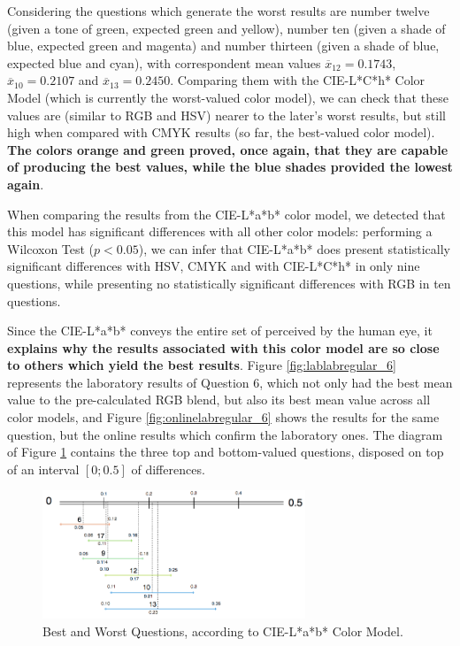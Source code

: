 %
Considering the questions which generate the worst results are number twelve (given a tone of green, expected green and yellow), number ten (given a shade of blue, expected green and magenta) and number thirteen
(given a shade of blue, expected blue and cyan), with correspondent mean values $\overline{x}_{12} = 0.1743$, $\overline{x}_{10} = 0.2107$ and $\overline{x}_{13} = 0.2450$. Comparing them with the CIE-L*C*h* Color Model
(which is currently the worst-valued color model), we can check that these values are (similar to RGB and HSV) nearer to the later's worst results, but still high when compared with CMYK results (so far, the
best-valued color model). \textbf{The colors orange and green proved, once again, that they are capable of producing the best values, while the blue shades provided the lowest again}. \par
%
When comparing the results from the CIE-L*a*b* color model, we detected that this model has significant differences with all other color models: performing a Wilcoxon Test ($p < 0.05$), we can infer that
CIE-L*a*b* does present statistically significant differences with HSV, CMYK and with CIE-L*C*h* in only nine questions, while presenting no statistically significant differences with RGB
in ten questions. \par
%
Since the CIE-L*a*b* conveys the entire set of perceived by the human eye, it \textbf{explains why the results associated with this color model are so close to others which yield the best results}.
Figure \ref{fig:lablabregular_6} represents the laboratory results of Question 6, which not only had the best mean value to the pre-calculated RGB blend, but also its best mean value across all color models,
and Figure \ref{fig:onlinelabregular_6} shows the results for the same question, but the online results which confirm the laboratory ones. The diagram of Figure \ref{fig:lab_analysis} contains the three top and bottom-valued questions, disposed on top of an interval $[0 ; 0.5]$ of differences. \par
%
\begin{figure}[!htbp]
  \centering
  \includegraphics[width=0.7\textwidth]{images/results/lab_questions_analysis.png}
  \caption[Best and Worst Questions, according to CIE-L*a*b* Color Model.]{Best and Worst Questions, according to CIE-L*a*b* Color Model.}
  \label{fig:lab_analysis}
\end{figure}
%
